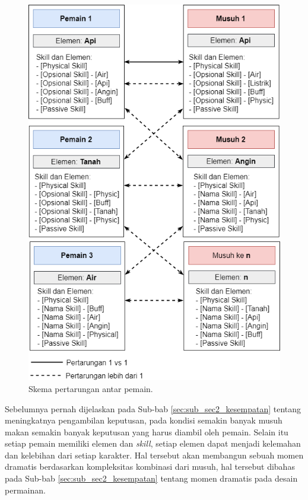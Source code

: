 \begin{figure} [!h] \centering
	\includegraphics[scale=0.48]{img/battle_player_new.png}
	\caption{Skema pertarungan antar pemain.}
	\label{fig:battle_player}
\end{figure}

Sebelumnya pernah dijelaskan pada Sub-bab \ref{sec:sub_sec2_kesempatan} tentang meningkatnya pengambilan keputusan, pada kondisi semakin banyak musuh makan semakin banyak keputusan yang harus diambil oleh pemain. Selain itu setiap pemain memiliki elemen dan \textit{skill}, setiap elemen dapat menjadi kelemahan dan kelebihan dari setiap karakter. Hal tersebut akan membangun sebuah momen dramatis berdasarkan kompleksitas kombinasi dari musuh, hal tersebut dibahas pada Sub-bab \ref{sec:sub_sec2_kesempatan} tentang momen dramatis pada desain permainan.
\vspace{1ex}

